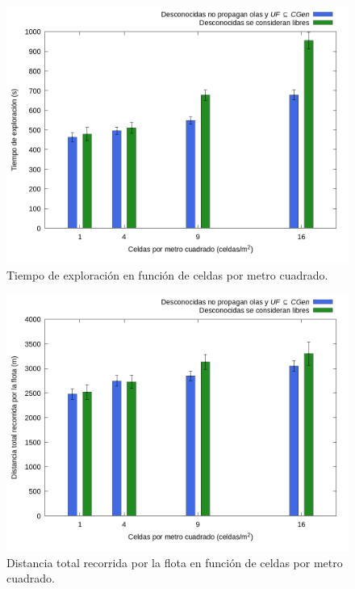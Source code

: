 \begin{figure}[H]
  \centerfloat
  \includegraphics[clip=true, width=\graphlen]{imagenes/graficas_chicas/graficas_histo_num/desconocido/exploration_time.png}
  \caption{Tiempo de exploración en función de celdas por metro cuadrado.}\label{fig:gra:des:et}
\end{figure}

\begin{figure}[H]
  \centerfloat
  \includegraphics[clip=true, width=\graphlen]{imagenes/graficas_chicas/graficas_histo_num/desconocido/exploration_cost.png}
  \caption{Distancia total recorrida por la flota en función de celdas por metro cuadrado.}\label{fig:gra:des:ec}
\end{figure}


